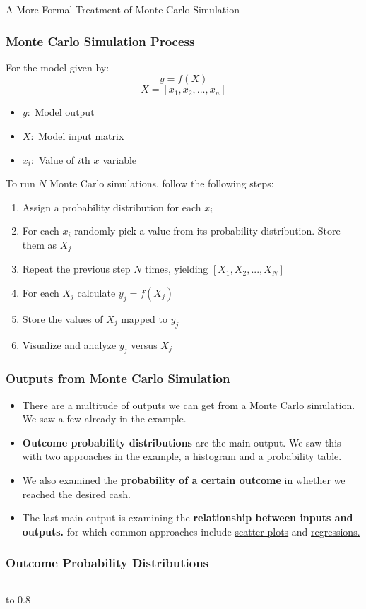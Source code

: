 \documentclass[handout, 11pt]{beamer}
\begin{document}
\begin{section}[Formal MC]{A More Formal Treatment of Monte Carlo Simulation}
\begin{frame}
\frametitle{Monte Carlo Simulation Process}
\footnotesize
For the model given by:
\begin{equation}
	y = f(X)
\end{equation}
\begin{equation}
	X = [x_1, x_2, ..., x_n]
\end{equation}
\begin{itemize}
\item $y:$
Model output
\item $X:$
Model input matrix
\item $x_i:$
Value of $i$th $x$ variable
\end{itemize}
To run $N$ Monte Carlo simulations, follow the following steps:
\begin{enumerate}
\item Assign a probability distribution for each
$x_i$
\item For each
$x_i$
randomly pick a value from its probability distribution. Store them as
$X_j$
\item Repeat the previous step $N$ times, yielding
$[X_1, X_2, ..., X_N]$
\item For each
$X_j$
calculate
$y_j = f(X_j)$
\item Store the values of
$X_j$
mapped to
$y_j$
\item Visualize and analyze
$y_j$
versus
$X_j$
\end{enumerate}
\end{frame}
\begin{frame}
\frametitle{Outputs from Monte Carlo Simulation}
\begin{itemize}
\item There are a multitude of outputs we can get from a Monte Carlo simulation. We saw a few already in the example.
\vfill
\item \textbf{Outcome probability distributions}
are the main output. We saw this with two approaches in the example, a
\underline{histogram}
and a
\underline{probability table.}
\vfill
\item We also examined the
\textbf{probability of a certain outcome}
in whether we reached the desired cash.
\vfill
\item The last main output is examining the
\textbf{relationship between inputs and outputs.}
for which common approaches include
\underline{scatter plots}
and
\underline{regressions.}
\end{itemize}
\end{frame}
\begin{frame}
\frametitle{Outcome Probability Distributions}
\begin{columns}
\begin{column}{0.5\textwidth}
\vbox to 0.8
\end{column}
\end{columns}
\end{frame}
\end{section}
\end{document}
